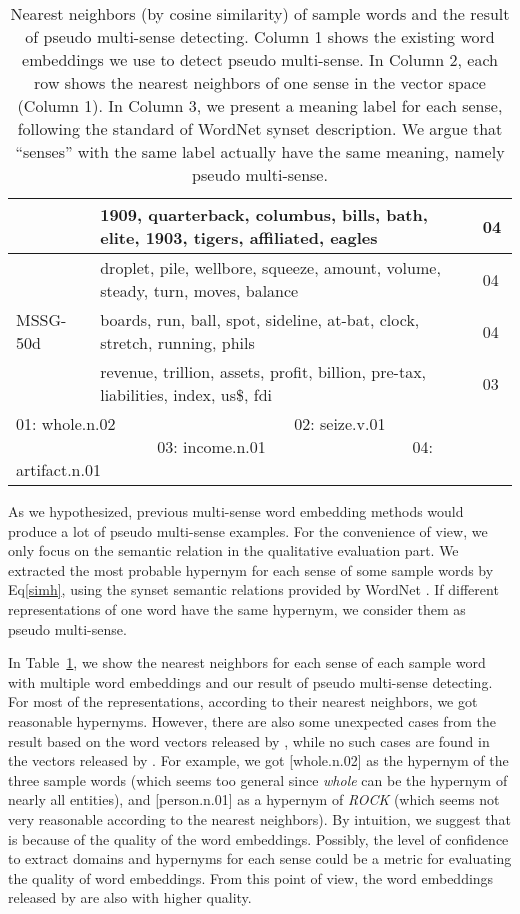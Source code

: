 \documentclass[11pt]{article}
\begin{document}
\begin{table}[htbp]
\begin{tabular}{|l|l|l|}
&1909, quarterback, columbus, bills, bath, elite, 1903, tigers, affiliated, eagles&04\\
\hline
\multirow{3}{*}{MSSG-50d} 
&droplet, pile, wellbore, squeeze, amount, volume, steady, turn, moves, balance&04\\
&boards, run, ball, spot, sideline, at-bat, clock, stretch, running, phils&04\\
&revenue, trillion, assets, profit, billion, pre-tax, liabilities, index, us\$, fdi&03\\
\hline
\multicolumn{3}{l}{01: whole.n.02 ~~~~~~~~~~~~~~~~~~~~~ 02: seize.v.01 ~~~~~~~~~~~~~~~~~ 03: income.n.01 ~~~~~~~~~~~~~~~~~ 04: artifact.n.01}
\end{tabular}
\caption{\label{nntable} Nearest neighbors (by cosine similarity) of sample words and the result of pseudo multi-sense detecting. Column 1 shows the existing word embeddings we use to detect pseudo multi-sense. In Column 2, each row shows the nearest neighbors of one sense in the vector space (Column 1). In Column 3, we present a meaning label for each sense, following the standard of WordNet synset description. We argue that ``senses'' with the same label actually have the same meaning, namely pseudo multi-sense.}
\end{table}
\par
As we hypothesized, previous multi-sense word embedding methods would produce a lot of pseudo multi-sense examples. For the convenience of view, we only focus on the semantic relation in the qualitative evaluation part. We extracted the most probable hypernym for each sense of some sample words by Eq\eqref{simh}, using the synset semantic relations provided by WordNet \cite{miller1995wordnet}. If different representations of one word have the same hypernym, we consider them as pseudo multi-sense. 
\par
In Table~\ref{nntable}, we show the nearest neighbors for each sense of each sample word with multiple word embeddings and our result of pseudo multi-sense detecting. For most of the representations, according to their nearest neighbors, we got reasonable hypernyms. However, there are also some unexpected cases from the result based on the word vectors released by , while no such cases are found in the vectors released by . For example, we got [whole.n.02] as the hypernym of the three sample words (which seems too general since {\sl whole} can be the hypernym of nearly all entities), and [person.n.01] as a hypernym of {\sl ROCK} (which seems not very reasonable according to the nearest neighbors). By intuition, we suggest that is because of the quality of the word embeddings. Possibly, the level of confidence to extract domains and hypernyms for each sense could be a metric for evaluating the quality of word embeddings. From this point of view, the word embeddings released by  are also with higher quality.
\end{document}
